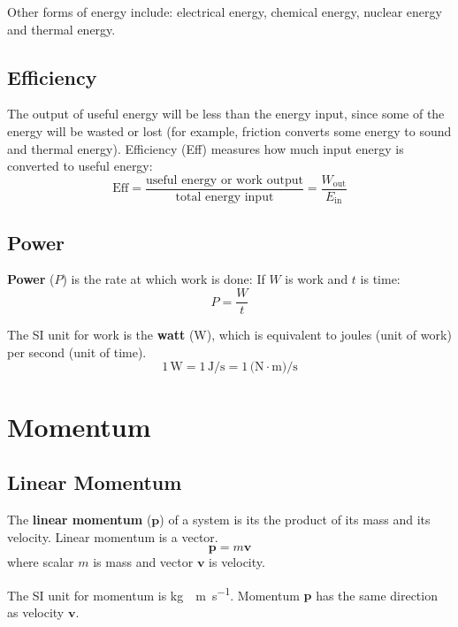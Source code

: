 \documentclass{article}
\newcommand{\definition}[1]{\begin{tcolorbox}[colback=red!5!white,colframe=red!75!black,parbox=false] #1 \end{tcolorbox}}
\begin{document}
Other forms of energy include: electrical energy, chemical energy, nuclear energy and thermal energy.

\subsection{Efficiency}

The output of useful energy will be less than the energy input, since some of the energy will be wasted or lost (for example, friction converts some energy to sound and thermal energy). Efficiency (Eff) measures how much input energy is converted to useful energy:
\begin{equation*}
	\text{Eff}=\frac{\text{useful energy or work output}}{\text{total energy input}}=\frac{W_\text{out}}{E_\text{in}}
\end{equation*}

\subsection{Power}

\definition{\textbf{Power} ($P$) is the rate at which work is done: If $W$ is work and $t$ is time:
\begin{equation*}
    P=\frac{W}{t}
\end{equation*}}

The SI unit for work is the \textbf{watt} (W), which is equivalent to joules (unit of work) per second (unit of time).
\begin{equation*}
	1\,\si{\watt}
	=1\,\si{\joule\per\second}
	=1\,\si{(\newton\cdot\meter)\per\second}
\end{equation*}

\section{Momentum}

\subsection{Linear Momentum}

\definition{The \textbf{linear momentum} ($\mathbf p$) of a system is its the product of its mass and its velocity. Linear momentum is a vector.
\begin{equation*}
	\mathbf{p}=m \mathbf{v}
\end{equation*}
where scalar $m$ is mass and vector $\mathbf{v}$ is velocity.}
The SI unit for momentum is \si{\kilogram\cdot\meter\per\second}. Momentum $\mathbf{p}$ has the same direction as velocity $\mathbf{v}$.
\end{document}
